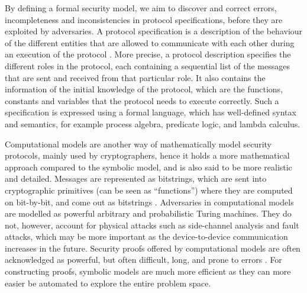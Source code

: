By defining a formal security model, we aim to discover and correct errors, incompleteness and inconsistencies in protocol specifications, before they are exploited by adversaries. A protocol specification is a description of the behaviour of the different entities that are allowed to communicate with each other during an execution of the protocol \cite{cremers2005operational}. More precise, a protocol description specifies the different roles in the protocol, each containing a sequential list of the messages that are sent and received from that particular role. It also contains the information of the initial knowledge of the protocol, which are the functions, constants and variables that the protocol needs to execute correctly. Such a specification is expressed using a formal language, which has well-defined syntax and semantics, for example process algebra, predicate logic, and lambda calculus. 

Computational models are another way of mathematically model security protocols, mainly used by cryptographers, hence it holds a more mathematical approach compared to the symbolic model, and is also said to be more realistic and detailed. Messages are represented as bitstrings, which are sent into cryptographic primitives (can be seen as ``functions'') where they are computed on bit-by-bit, and come out as bitstrings \cite{blanchet2012security}. Adversaries in computational models are modelled as powerful arbitrary and probabilistic Turing machines. They do not, however, account for physical attacks such as side-channel analysis and fault attacks, which may be more important as the device-to-device communication increases in the future. Security proofs offered by computational models are often acknowledged as powerful, but often difficult, long, and prone to errors \cite{cortier2011survey}. For constructing proofs, symbolic models are much more efficient as they can more easier be automated to explore the entire problem space.


